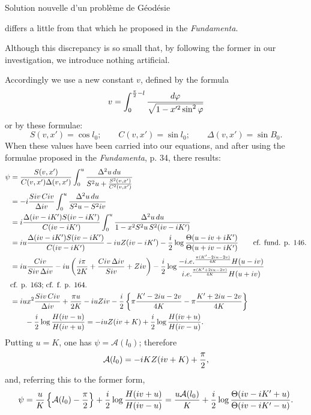 \begingroup\small
\begin{center}
Solution nouvelle d'un problème de Géodésie
\end{center}
differs a little from that which he proposed in the \emph{Fundamenta}.

Although this discrepancy is so small that, by following the former in our investigation, we introduce nothing artificial.

Accordingly we use a new constant $v$, defined by the formula
\[
 v=\int_0^{\frac{\pi}{2}-l}{d\varphi\over \sqrt{1-x'^2\sin^2\varphi}}
\]
or by these formulae:
\[
 S(v,x')=\cos l_0;\qquad C(v,x')=\sin l_0;\qquad \Delta(v,x')=\sin B_0.
\]
When these values have been carried into our equations, and after using the formulae proposed in the \emph{Fundamenta}, p. 34, there results:
{\small
\[
\begin{aligned}
\psi&={S(v,x')\over C(v,x')\Delta(v,x')}
  \int_0^u {\Delta^2u\,du\over S^2u+{S^2(v,x')\over C^2(v,x')}}\\
&=-i{Siv\,Civ\over \Delta iv}\int_0^u{\Delta^2u\,du\over S^2u-S^2iv}\\
&=i{\Delta(iv-iK')S(iv-iK')\over C(iv-iK')}
  \int_0^u {\Delta^2u\,du\over 1-x^2S^2u\,S^2(iv-iK')}\\
&=iu{\Delta(iv-iK')S(iv-iK')\over C(iv-iK')}
  -iuZ(iv-iK')-{i\over2}\log{\Theta(u-iv+iK')\over\Theta(u+iv-iK')}\qquad \text{cf. fund. p. 146.}\\
&=iu{Civ\over Siv\,\Delta iv}-iu\left({i\pi\over2K}+{Civ\,\Delta iv\over Siv}+Ziv\right)
 -{i\over2}\log{-i.e.^{{\pi(K'-2iu-2v)\over4K}}H(u-iv)\over i.e.^{{\pi(K'+2iu-2v)\over4K}}H(u+iv)}\\
&\hfill \text{cf. p. 163; cf. f. p. 164.}\\
&=iux^2{Siv\,Civ\over\Delta iv}+{\pi u\over2K}-iuZiv
 -{i\over2}\left\{\pi{K'-2iu-2v\over4K}-\pi{K'+2iu-2v\over4K}\right\}\\
&\qquad{}-{i\over2}\log{H(iv-u)\over H(iv+u)}
=-iuZ(iv+K)+{i\over2}\log{H(iv+u)\over H(iv-u)}.
\end{aligned}
\]
}
Putting $u=K$, one has $\psi=\mathcal A(l_0)$; therefore
\[
 \mathcal A(l_0)=-iKZ(iv+K)+{\pi\over2},
\]
and, referring this to the former form,
\[
 \psi={u\over K}\left\{\mathcal A(l_0)-{\pi\over2}\right\}
 +{i\over2}\log{H(iv+u)\over H(iv-u)}
 ={u\mathcal A(l_0)\over K}+{i\over2}\log{\Theta(iv-iK'+u)\over \Theta(iv-iK'-u)}.
\]
\endgroup
